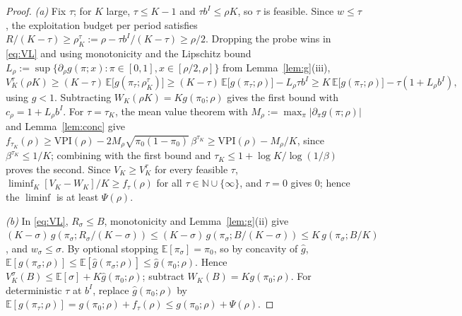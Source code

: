 \documentclass[11pt]{article}
\theoremstyle{definition}
\theoremstyle{remark}
\newcommand{\E}{\mathbb{E}}
\newcommand{\VPI}{\mathrm{VPI}}
\newcommand{\gcav}{\hat g}
\begin{document}
\begin{proof}
\emph{(a)} Fix $\tau$; for $K$ large, $\tau\le K-1$ and $\tau b^I\le\rho K$, so $\tau$ is feasible. Since $w\le\tau$,
the exploitation budget per period satisfies
$R/(K-\tau)\ge\rho_K^\tau:=\rho-\tau b^I/(K-\tau)\ge\rho/2$. Dropping the probe wins in \eqref{eq:VL} and using
monotonicity and the Lipschitz bound $L_\rho:=\sup\{\partial_\rho g(\pi;x):\pi\in[0,1],x\in[\rho/2,\rho]\}$ from
Lemma~\ref{lem:g}(iii),
\[
V_K^\tau(\rho K)\ge(K-\tau)\,\E\bigl[g(\pi_\tau;\rho_K^\tau)\bigr]
\ge(K-\tau)\,\E\bigl[g(\pi_\tau;\rho)\bigr]-L_\rho\tau b^I
\ge K\,\E\bigl[g(\pi_\tau;\rho)\bigr]-\tau(1+L_\rho b^I),
\]
using $g<1$. Subtracting $W_K(\rho K)=K g(\pi_0;\rho)$ gives the first bound with $c_\rho=1+L_\rho b^I$. For
$\tau=\tau_K$, the mean value theorem with $M_\rho:=\max_\pi|\partial_\pi g(\pi;\rho)|$ and
Lemma~\ref{lem:conc} give
$f_{\tau_K}(\rho)\ge\VPI(\rho)-2M_\rho\sqrt{\pi_0(1-\pi_0)}\,\beta^{\tau_K}\ge\VPI(\rho)-M_\rho/K$, since
$\beta^{\tau_K}\le1/K$; combining with the first bound and $\tau_K\le1+\log K/\log(1/\beta)$ proves the second.
Since $V_K\ge V_K^\tau$ for every feasible $\tau$, $\liminf_K[V_K-W_K]/K\ge f_\tau(\rho)$ for all
$\tau\in\mathbb N\cup\{\infty\}$, and $\tau=0$ gives $0$; hence the $\liminf$ is at least $\Psi(\rho)$.

\emph{(b)} In \eqref{eq:VL}, $R_\sigma\le B$, monotonicity and Lemma~\ref{lem:g}(ii) give
$(K-\sigma)\,g(\pi_\sigma;R_\sigma/(K-\sigma))\le(K-\sigma)\,g(\pi_\sigma;B/(K-\sigma))\le K\,g(\pi_\sigma;B/K)$,
and $w_\sigma\le\sigma$. By optional stopping $\E[\pi_\sigma]=\pi_0$, so by concavity of $\gcav$,
$\E[g(\pi_\sigma;\rho)]\le\E[\gcav(\pi_\sigma;\rho)]\le\gcav(\pi_0;\rho)$. Hence
$V_K^\sigma(B)\le\E[\sigma]+K\gcav(\pi_0;\rho)$; subtract $W_K(B)=Kg(\pi_0;\rho)$. For deterministic $\tau$ at $b^I$,
replace $\gcav(\pi_0;\rho)$ by $\E[g(\pi_\tau;\rho)]=g(\pi_0;\rho)+f_\tau(\rho)\le g(\pi_0;\rho)+\Psi(\rho)$.


\end{proof}
\end{document}
